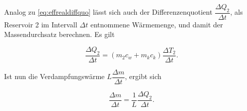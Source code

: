 Analog zu \eqref{eq:effrealdiffquo} lässt sich auch der Differenzenquotient $\dfrac{ΔQ_2}{Δt}$, als Reservoir 2 im Intervall $Δt$ entnommene Wärmemenge, und damit der Massendurchsatz berechnen.
Es gilt

\begin{equation}
    \dfrac{ΔQ_2}{Δt} = (m_2c_w +m_kc_k)\dfrac{ΔT_2}{Δt}.
\end{equation}

Ist nun die Verdampfungswärme $L\dfrac{Δm}{Δt}$, ergibt sich

\begin{equation}
    \dfrac{Δm}{Δt} = \dfrac{1}{L}\dfrac{ΔQ_2}{Δt}.
\end{equation}

    

